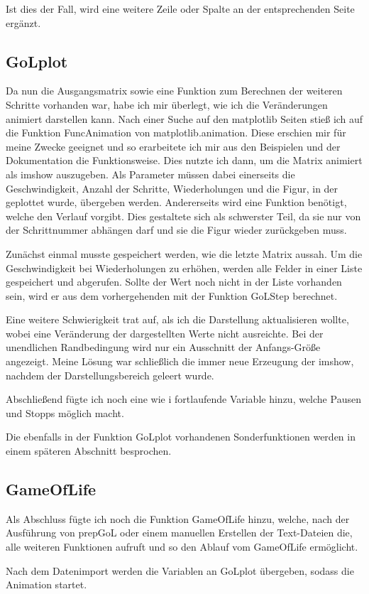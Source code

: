 \documentclass{scrartcl}
\begin{document}
Ist dies der Fall, wird eine weitere Zeile oder Spalte an der entsprechenden Seite ergänzt.

\subsection{GoLplot}
Da nun die Ausgangsmatrix sowie eine Funktion zum Berechnen der weiteren Schritte vorhanden war, habe ich mir überlegt, wie ich die Veränderungen animiert darstellen kann. Nach einer Suche auf den matplotlib Seiten stieß ich auf die Funktion FuncAnimation von matplotlib.animation. Diese erschien mir für meine Zwecke geeignet und so erarbeitete ich mir aus den Beispielen und der Dokumentation die Funktionsweise. Dies nutzte ich dann, um die Matrix animiert als imshow auszugeben. Als Parameter müssen dabei einerseits die Geschwindigkeit, Anzahl der Schritte, Wiederholungen und die Figur, in der geplottet wurde, übergeben werden. Andererseits wird eine Funktion benötigt, welche den Verlauf vorgibt. Dies gestaltete sich als schwerster Teil, da sie nur von der Schrittnummer abhängen darf und sie die Figur wieder zurückgeben muss.

Zunächst einmal musste gespeichert werden, wie die letzte  Matrix aussah. Um die Geschwindigkeit bei Wiederholungen zu erhöhen, werden alle Felder in einer Liste gespeichert und abgerufen. Sollte der Wert noch nicht in der Liste vorhanden sein, wird er aus dem vorhergehenden mit der Funktion GoLStep berechnet.

Eine weitere Schwierigkeit trat auf, als ich die Darstellung aktualisieren wollte, wobei eine Veränderung der dargestellten Werte nicht ausreichte. Bei der unendlichen Randbedingung wird nur ein Ausschnitt der Anfangs-Größe angezeigt. Meine Lösung war schließlich die immer neue Erzeugung der imshow, nachdem der Darstellungsbereich geleert wurde.

Abschließend fügte ich noch eine wie i fortlaufende Variable hinzu, welche Pausen und Stopps möglich macht.

Die ebenfalls in der Funktion GoLplot vorhandenen Sonderfunktionen werden in einem späteren Abschnitt besprochen.

\subsection{GameOfLife}
Als Abschluss fügte ich noch die Funktion GameOfLife hinzu, welche, nach der Ausführung von prepGoL oder einem manuellen Erstellen der Text-Dateien die, alle weiteren Funktionen aufruft und so den Ablauf vom GameOfLife ermöglicht.

Nach dem Datenimport werden die Variablen an GoLplot übergeben, sodass die Animation startet.
\end{document}
